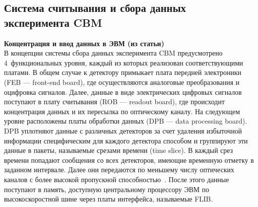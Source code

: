 
\subsection{Система считывания и сбора данных эксперимента CBM}\label{sec:CBMreadout}

\textbf{Концентрация и ввод данных в ЭВМ (из статьи)} \\
В концепции системы сбора данных эксперимента CBM предусмотрено 4~функциональных уровня, каждый из которых реализован соответствующими платами. В общем случае к детектору примыкает плата передней электроники (FEB --- front-end board), где осуществляются аналоговые преобразования и оцифровка сигналов. Далее, данные в виде электрических цифровых сигналов поступают в плату считывания (ROB --- readout board), где происходит концентрация данных и их пересылка по оптическому каналу. На следующем уровне расположены платы обработки данных (DPB --- data processing board). DPB уплотняют данные с различных детекторов за счет удаления избыточной информации специфическим для каждого детектора способом и группируют эти данные в пакеты, называемые срезами времени (time slice). В каждый срез времени попадают сообщения со всех детекторов, имеющие временную отметку в заданном интервале. Далее они передаются по меньшему числу оптических каналов с более высокой пропускной способностью~\cite{DPB}. После этого данные поступают в память, доступную центральному процессору ЭВМ по высокоскоростной шине через платы интерфейса, называемые FLIB.

